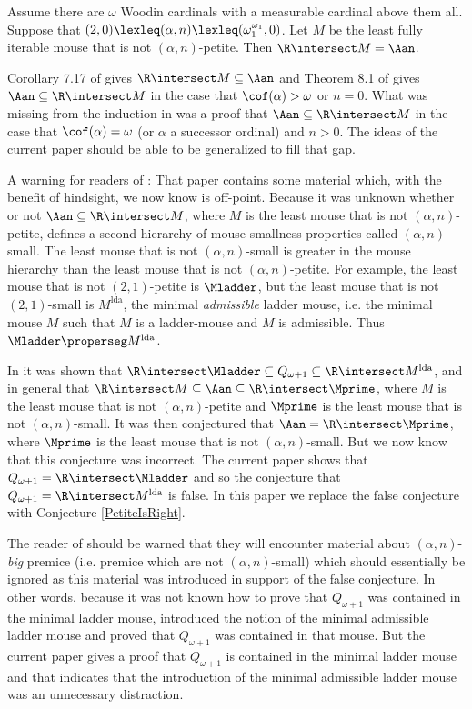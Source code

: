 \documentclass[oneside,12pt]{amsart}
\begin{document}
\begin{conjecture}
\label{PetiteIsRight}
Assume there are $\omega$ Woodin cardinals with a measurable cardinal above them all. Suppose that
$(2,0) \lexleq (\alpha,n) \lexleq (\omega_1^{\omega_1}, 0)$.
Let $M$ be the least fully iterable mouse that is not $(\alpha, n)$-petite.
Then $\R\intersect M = \Aan$.
\end{conjecture}

Corollary 7.17 of \cite{Mouse_Sets} gives $\R\intersect M \subseteq \Aan$
and Theorem 8.1 of \cite{Mouse_Sets} gives $\Aan \subseteq \R\intersect M$
in the case that $\cof(\alpha)>\omega$ or $n=0$. What was missing from the
induction in \cite{Mouse_Sets} was a proof that $\Aan\subseteq \R \intersect M$
in the case that $\cof(\alpha)=\omega$ (or $\alpha$ a successor ordinal) and $n>0$.
The ideas of the current paper
should be able to be generalized to fill that gap.

A warning for readers of \cite{Mouse_Sets}: That paper contains some material which, with the benefit of hindsight,
we now know is off-point. Because it was unknown whether or not
$\Aan\subseteq \R\intersect M$, where $M$ is the least mouse that is not
$(\alpha,n)$-petite, \cite{Mouse_Sets} defines a second hierarchy of mouse
smallness properties called $(\alpha,n)$-small. The least mouse that is not
$(\alpha,n)$-small is greater in the mouse hierarchy than the least mouse that
is not $(\alpha,n)$-petite. For example, the least mouse that is not
$(2,1)$-petite is $\Mladder$, but the least mouse that is not
$(2,1)$-small is $M^{\text{lda}}$, the minimal \emph{admissible} ladder mouse,
i.e. the minimal mouse $M$ such that $M$ is a ladder-mouse and
$M$ is admissible. Thus $\Mladder\properseg M^{\text{lda}}$.

In
\cite{Mouse_Sets} it was shown that
$\R\intersect \Mladder \subseteq Q_{\omega+1}\subseteq \R\intersect M^{\text{lda}}$, and in general that $\R \intersect M \subseteq \Aan\subseteq \R\intersect\Mprime$, where $M$ is the least mouse that is not
$(\alpha,n)$-petite and $\Mprime$ is the least mouse that is not
$(\alpha,n)$-small. It was then conjectured that
$\Aan=\R\intersect \Mprime$, where $\Mprime$ is the least mouse that is not
$(\alpha,n)$-small. But we now know that this conjecture was incorrect. The
current
paper shows that $Q_{\omega+1}=\R\intersect\Mladder$ and so the conjecture
that $Q_{\omega+1}=\R\intersect M^{\text{lda}}$ is false. In this paper we
replace the false conjecture with Conjecture \ref{PetiteIsRight}.

The reader of \cite{Mouse_Sets} should be warned that they will encounter
material about $(\alpha,n)$-\emph{big} premice
(i.e. premice which are not $(\alpha,n)$-small) which should essentially
be ignored as this material was introduced in support of the false conjecture.
In other words, because it was not known how to prove that $Q_{\omega+1}$
was contained in the minimal ladder mouse, \cite{Mouse_Sets} introduced the
notion of the minimal admissible ladder mouse and proved that
$Q_{\omega+1}$ was contained in that mouse. But the current paper gives a
proof that $Q_{\omega+1}$ is contained in the minimal ladder mouse and
that indicates
that the introduction of the minimal admissible ladder mouse was an
unnecessary distraction.
\end{document}

